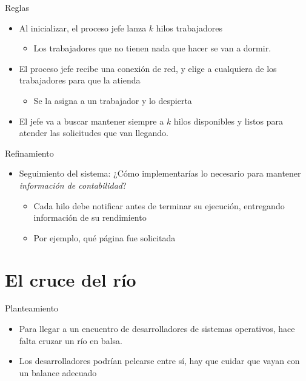 \documentclass[presentation]{beamer}
\begin{document}
\begin{frame}[label={sec:org948bbad}]{Reglas}
\begin{itemize}
\item Al inicializar, el proceso jefe lanza \(k\) hilos trabajadores
\begin{itemize}
\item Los trabajadores que no tienen nada que hacer se van a dormir.
\end{itemize}
\item El proceso jefe recibe una conexión de red, y elige a cualquiera de
los trabajadores para que la atienda
\begin{itemize}
\item Se la asigna a un trabajador y lo despierta
\end{itemize}
\item El jefe va a buscar mantener siempre a \(k\) hilos disponibles y
listos para atender las solicitudes que van llegando.
\end{itemize}
\end{frame}

\begin{frame}[label={sec:org71ed05e}]{Refinamiento}
\begin{itemize}
\item Seguimiento del sistema: ¿Cómo implementarías lo necesario para
mantener \emph{información de contabilidad}?
\begin{itemize}
\item Cada hilo debe notificar antes de terminar su ejecución,
entregando información de su rendimiento
\item Por ejemplo, qué página fue solicitada
\end{itemize}
\end{itemize}
\end{frame}


\section{El cruce del río}
\label{sec:org346bdba}
\begin{frame}[label={sec:orged8c50a}]{Planteamiento}
\begin{itemize}
\item Para llegar a un encuentro de desarrolladores de sistemas
operativos, hace falta cruzar un río en balsa.
\item Los desarrolladores podrían pelearse entre sí, hay que cuidar que
vayan con un balance adecuado
\end{itemize}
\end{frame}
\end{document}
